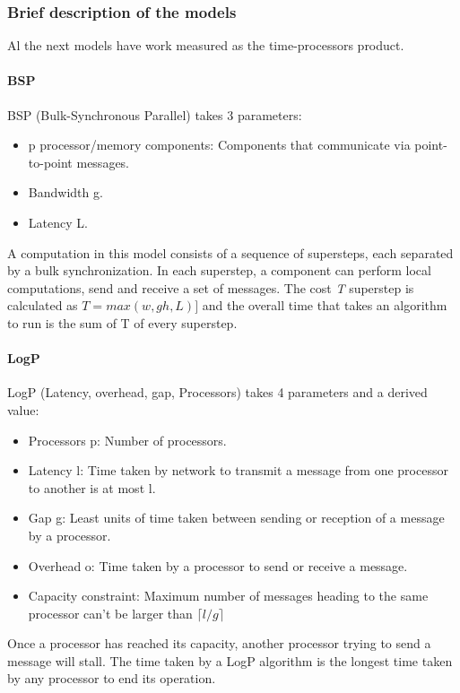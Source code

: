 \documentclass[12pt,a4paper]{article}
\begin{document}
\subsubsection{Brief description of the models}
Al the next models have work measured as the time-processors product.
\paragraph{BSP}
BSP (Bulk-Synchronous Parallel) takes 3 parameters:
\begin{itemize}
	\item p processor/memory components: Components that communicate via point-to-point messages.
	\item Bandwidth g.
	\item Latency L.
\end{itemize}
A computation in this model consists of a sequence of supersteps, each separated by a bulk synchronization. In each superstep, a component can perform 
local computations, send and receive a set of messages. The cost \textit T superstep is calculated as $T = max(w, gh, L)]$ and the overall time 
that takes an algorithm to run is the sum of T of every superstep.
\paragraph{LogP}
LogP (Latency, overhead, gap, Processors) takes 4 parameters and a derived value:
\begin{itemize}
	\item Processors p: Number of processors.
	\item Latency l: Time taken by network to transmit a message from one processor to another is at most l.
	\item Gap g: Least units of time taken between sending or reception of a message by a processor.
	\item Overhead o: Time taken by a processor to send or receive a message.
	\item Capacity constraint: Maximum number of messages heading to the same processor can't be larger than $\lceil l/g \rceil$
\end{itemize}
Once a processor has reached its capacity, another processor trying to send a message will stall. The time taken by a LogP algorithm is the longest 
time taken by any processor to end its operation.
\end{document}
